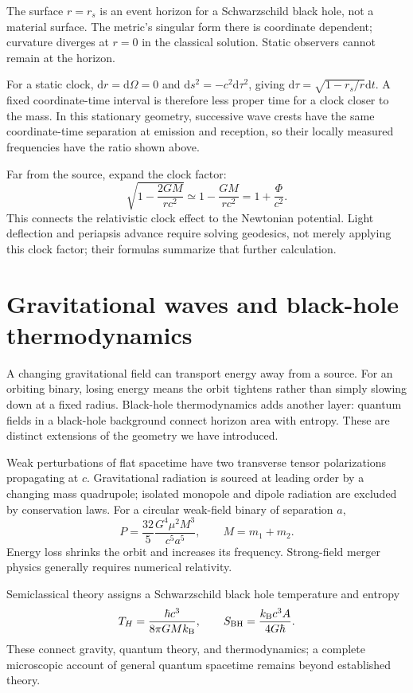 \documentclass[11pt,oneside]{book}
\newcommand{\dd}{\mathrm{d}}
\newcommand{\kb}{k_{\mathrm B}}
\theoremstyle{reviewstyle}
\begin{document}
The surface $r=r_s$ is an event horizon for a Schwarzschild black hole, not a material surface. The metric's singular form there is coordinate dependent; curvature diverges at $r=0$ in the classical solution. Static observers cannot remain at the horizon.

For a static clock, $\dd r=\dd\Omega=0$ and $\dd s^2=-c^2\dd\tau^2$, giving $\dd\tau=\sqrt{1-r_s/r}\dd t$. A fixed coordinate-time interval is therefore less proper time for a clock closer to the mass. In this stationary geometry, successive wave crests have the same coordinate-time separation at emission and reception, so their locally measured frequencies have the ratio shown above.

Far from the source, expand the clock factor:
\begin{equation}
\sqrt{1-\frac{2GM}{rc^2}}\simeq1-\frac{GM}{rc^2}
=1+\frac{\Phi}{c^2}.
\end{equation}
This connects the relativistic clock effect to the Newtonian potential. Light deflection and periapsis advance require solving geodesics, not merely applying this clock factor; their formulas summarize that further calculation.

\section{Gravitational waves and black-hole thermodynamics}
A changing gravitational field can transport energy away from a source. For an orbiting binary, losing energy means the orbit tightens rather than simply slowing down at a fixed radius. Black-hole thermodynamics adds another layer: quantum fields in a black-hole background connect horizon area with entropy. These are distinct extensions of the geometry we have introduced.

Weak perturbations of flat spacetime have two transverse tensor polarizations propagating at $c$. Gravitational radiation is sourced at leading order by a changing mass quadrupole; isolated monopole and dipole radiation are excluded by conservation laws. For a circular weak-field binary of separation $a$,
\begin{equation}P=\frac{32}{5}\frac{G^4\mu^2M^3}{c^5a^5},\qquad M=m_1+m_2.\end{equation}
Energy loss shrinks the orbit and increases its frequency. Strong-field merger physics generally requires numerical relativity.

Semiclassical theory assigns a Schwarzschild black hole temperature and entropy
\begin{equation}T_H=\frac{\hbar c^3}{8\pi G M\kb},\qquad S_{\rm BH}=\frac{\kb c^3A}{4G\hbar}.\end{equation}
These connect gravity, quantum theory, and thermodynamics; a complete microscopic account of general quantum spacetime remains beyond established theory.
\end{document}
